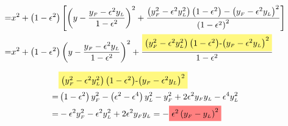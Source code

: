 \documentclass[
]{book}
\theoremstyle{definition}
\theoremstyle{definition}
\theoremstyle{definition}
\theoremstyle{definition}
\theoremstyle{remark}
\begin{document}
\begin{align}
= & x^{2}+\left(1-\epsilon^{2}\right)\left[\left(y-\dfrac{y_{{\scriptscriptstyle F}}-\epsilon^{2}y_{{\scriptscriptstyle L}}}{1-\epsilon^{2}}\right)^{2}+\dfrac{\left(y_{{\scriptscriptstyle F}}^{2}-\epsilon^{2}y_{{\scriptscriptstyle L}}^{2}\right)\left(1-\epsilon^{2}\right)-\left(y_{{\scriptscriptstyle F}}-\epsilon^{2}y_{{\scriptscriptstyle L}}\right)^{2}}{\left(1-\epsilon^{2}\right)^{2}}\right]\\
= & x^{2}+\left(1-\epsilon^{2}\right)\left(y-\dfrac{y_{{\scriptscriptstyle F}}-\epsilon^{2}y_{{\scriptscriptstyle L}}}{1-\epsilon^{2}}\right)^{2}+\dfrac{\colorbox{yellow!50}{\text{\ensuremath{\left(y_{{\scriptscriptstyle F}}^{2}-\epsilon^{2}y_{{\scriptscriptstyle L}}^{2}\right)\left(1-\epsilon^{2}\right)}-\ensuremath{\left(y_{{\scriptscriptstyle F}}-\epsilon^{2}y_{{\scriptscriptstyle L}}\right)^{2}}}}}{1-\epsilon^{2}}
\end{align}

\[
\begin{aligned}
 & \colorbox{yellow!50}{\text{\ensuremath{\left(y_{{\scriptscriptstyle F}}^{2}-\epsilon^{2}y_{{\scriptscriptstyle L}}^{2}\right)\left(1-\epsilon^{2}\right)}-\ensuremath{\left(y_{{\scriptscriptstyle F}}-\epsilon^{2}y_{{\scriptscriptstyle L}}\right)^{2}}}}\\
= & \left(1-\epsilon^{2}\right)y_{{\scriptscriptstyle F}}^{2}-\left(\epsilon^{2}-\epsilon^{4}\right)y_{{\scriptscriptstyle L}}^{2}-y_{{\scriptscriptstyle F}}^{2}+2\epsilon^{2}y_{{\scriptscriptstyle F}}y_{{\scriptscriptstyle L}}-\epsilon^{4}y_{{\scriptscriptstyle L}}^{2}\\
= & -\epsilon^{2}y_{{\scriptscriptstyle F}}^{2}-\epsilon^{2}y_{{\scriptscriptstyle L}}^{2}+2\epsilon^{2}y_{{\scriptscriptstyle F}}y_{{\scriptscriptstyle L}}=-\colorbox{red!50}{\text{\ensuremath{\epsilon^{2}\left(y_{{\scriptscriptstyle F}}-y_{{\scriptscriptstyle L}}\right)^{2}}}}
\end{aligned}
\]
\end{document}
